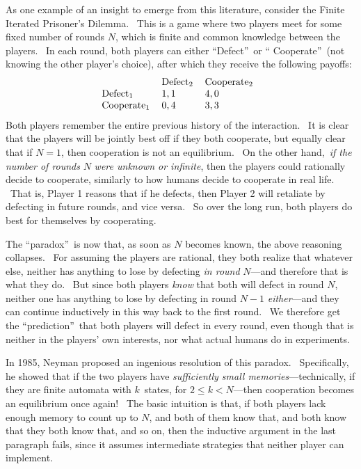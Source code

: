 \documentclass[11pt,onecolumn]{article}%
\begin{document}
As one example of an insight to emerge from this literature, consider the
Finite Iterated Prisoner's Dilemma. \ This is a game where two players meet
for some fixed number of rounds $N$, which is finite and common knowledge
between the players. \ In each round, both players can either
\textquotedblleft Defect\textquotedblright\ or \textquotedblleft
Cooperate\textquotedblright\ (not knowing the other player's choice), after
which they receive the following payoffs:%
\[%
\begin{tabular}
[c]{lll}
& Defect$_{2}$ & Cooperate$_{2}$\\
Defect$_{1}$ & $1,1$ & $4,0$\\
Cooperate$_{1}$ & $0,4$ & $3,3$%
\end{tabular}
\ \
\]
Both players remember the entire previous history of the interaction. \ It is
clear that the players will be jointly best off if they both cooperate, but
equally clear that if $N=1$, then cooperation is not an equilibrium. \ On the
other hand,\ \textit{if the number of rounds }$N$\textit{ were unknown or
infinite}, then the players could rationally decide to cooperate, similarly to
how humans decide to cooperate in real life. \ That is, Player 1 reasons that
if he defects, then Player 2 will retaliate by defecting in future rounds, and
vice versa. \ So over the long run, both players do best for themselves by cooperating.

The \textquotedblleft paradox\textquotedblright\ is now that, as soon as $N$
becomes known, the above reasoning collapses. \ For assuming the players are
rational, they both realize that whatever else, neither has anything to lose
by defecting \textit{in round} $N$---and therefore that is what they do. \ But
since both players \textit{know} that both will defect in round $N$, neither
one has anything to lose by defecting in round $N-1$ \textit{either}---and
they can continue inductively in this way back to the first round. \ We
therefore get the \textquotedblleft prediction\textquotedblright\ that both
players will defect in every round, even though that is neither in the
players' own interests, nor what actual humans do in experiments.

In 1985, Neyman \cite{neyman} proposed an ingenious resolution of this
paradox. \ Specifically, he showed that if the two players have
\textit{sufficiently small memories}---technically, if they are finite
automata with $k$\ states, for $2\leq k<N$---then cooperation becomes an
equilibrium once again! \ The basic intuition is that, if both players lack
enough memory to count up to $N$, and both of them know that, and both know
that they both know that, and so on, then the inductive argument in the last
paragraph fails, since it assumes intermediate strategies that neither player
can implement.
\end{document}
